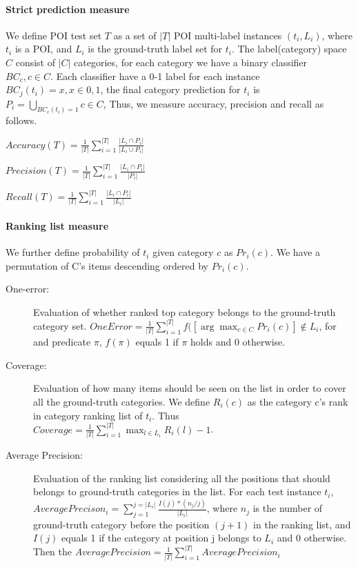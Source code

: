 \paragraph{Strict prediction measure} We define POI test set $T$ as a set of $|T|$ POI multi-label instances $(t_i, L_i)$, where $t_i$ is a POI, and $L_i$ is the ground-truth label set for $t_i$. The label(category) space $C$ consist of $|C|$ categories, for each category we have a binary classifier $BC_c, c \in C$. Each classifier have a 0-1 label for each instance $BC_j(t_i) = x, x \in {0,1}$, the final category prediction for $t_i$ is $P_i = \bigcup_{BC_c(t_i)=1} c \in C $,  Thus, we measure accuracy, precision and recall as follows.
\begin{description}
\centering
\item $Accuracy(T)=\frac{1}{|T|} \sum^{|T|}_{i=1} \frac{|L_i \cap P_i|}{|L_i \cup P_i|}$

\item $Precision(T)=\frac{1}{|T|} \sum^{|T|}_{i=1} \frac{|L_i \cap P_i|}{|P_i|}$

\item $Recall(T)=\frac{1}{|T|} \sum^{|T|}_{i=1} \frac{|L_i \cap P_i|}{|L_i|}$
\end{description}
\paragraph{Ranking list measure}
We further define probability of $t_i$ given category $c$ as $Pr_i(c)$. We have a permutation of C's items descending ordered by $Pr_i(c)$.
\begin{description}

\item[One-error:] Evaluation of whether ranked top category belongs to the ground-truth category set. $OneError = \frac{1}{|T|} \sum^{|T|}_{i=1}f([\arg\max_{c \in C} Pr_i(c)] \notin L_i$, for and predicate $\pi$, $f(\pi)$ equals 1 if $\pi$ holds and 0 otherwise.

\item[Coverage:] Evaluation of how many items should be seen on the list in order to cover all the ground-truth categories. We define $R_i(c)$ as the category c's rank in category ranking list of $t_i$. Thus  $Coverage = \frac{1}{|T|} \sum^{|T|}_{i=1} \max_{l \in L_i} R_i(l) -1$.

\item[Average Precision:] Evaluation of the ranking list considering all the positions that should belongs to ground-truth categories in the list. For each test instance $t_i$, $AveragePrecison_i = \sum_{j=1}^{j=|L_i|} \frac{I(j)*(n_j/j)}{|L_i|}$, where $n_j$ is the number of ground-truth category before the position $(j+1)$ in the ranking list, and $I(j)$ equals 1 if the category at position j belongs to $L_i$ and 0 otherwise. Then the $AveragePrecision = \frac{1}{|T|} \sum^{|T|}_{i=1} AveragePrecision_i$
\end{description}


